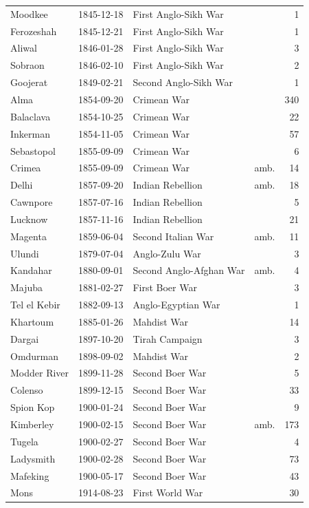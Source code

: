 \documentclass[11pt,a4paper]{article}
\begin{document}
\begin{small}
\begin{longtable}{llp{5.2cm}lr}
Moodkee & 1845-12-18 & First Anglo-Sikh War &  & 1\\
Ferozeshah & 1845-12-21 & First Anglo-Sikh War &  & 1\\
Aliwal & 1846-01-28 & First Anglo-Sikh War &  & 3\\
Sobraon & 1846-02-10 & First Anglo-Sikh War &  & 2\\
Goojerat & 1849-02-21 & Second Anglo-Sikh War &  & 1\\
Alma & 1854-09-20 & Crimean War &  & 340\\
Balaclava & 1854-10-25 & Crimean War &  & 22\\
Inkerman & 1854-11-05 & Crimean War &  & 57\\
Sebastopol & 1855-09-09 & Crimean War &  & 6\\
Crimea & 1855-09-09 & Crimean War & amb. & 14\\
Delhi & 1857-09-20 & Indian Rebellion & amb. & 18\\
Cawnpore & 1857-07-16 & Indian Rebellion &  & 5\\
Lucknow & 1857-11-16 & Indian Rebellion &  & 21\\
Magenta & 1859-06-04 & Second Italian War & amb. & 11\\
Ulundi & 1879-07-04 & Anglo-Zulu War &  & 3\\
Kandahar & 1880-09-01 & Second Anglo-Afghan War & amb. & 4\\
Majuba & 1881-02-27 & First Boer War &  & 3\\
Tel el Kebir & 1882-09-13 & Anglo-Egyptian War &  & 1\\
Khartoum & 1885-01-26 & Mahdist War &  & 14\\
Dargai & 1897-10-20 & Tirah Campaign &  & 3\\
Omdurman & 1898-09-02 & Mahdist War &  & 2\\
Modder River & 1899-11-28 & Second Boer War &  & 5\\
Colenso & 1899-12-15 & Second Boer War &  & 33\\
Spion Kop & 1900-01-24 & Second Boer War &  & 9\\
Kimberley & 1900-02-15 & Second Boer War & amb. & 173\\
Tugela & 1900-02-27 & Second Boer War &  & 4\\
Ladysmith & 1900-02-28 & Second Boer War &  & 73\\
Mafeking & 1900-05-17 & Second Boer War &  & 43\\
Mons & 1914-08-23 & First World War &  & 30\\

\end{longtable}
\end{small}
\end{document}
